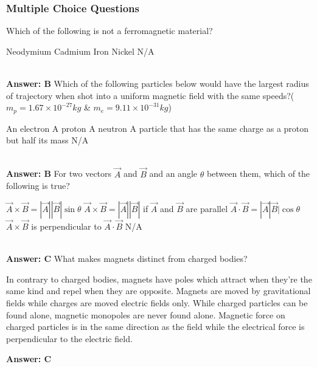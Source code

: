 \documentclass[12pt,addpoints]{exam}
\begin{document}
{{{				\subsubsection*{Multiple Choice Questions}
				\begin{questions}
					\question Which of the following is not a ferromagnetic material?\\ \begin{oneparchoices}
						\choice Neodymium
						\choice Cadmium
						\choice Iron
						\choice Nickel
						\choice N/A
					\end{oneparchoices} \\ \textbf{Answer: B}
					\question Which of the following particles below would have the largest radius of trajectory when shot into a uniform magnetic field with the same speeds?($m_p=1.67\times10^{-27}kg$ \& $m_e=9.11\times10^{-31}kg$) \\ \begin{oneparchoices}
						\choice An electron
						\choice A proton
						\choice A neutron
						\choice A particle that has the same charge as a proton but half its mass
						\choice N/A
					\end{oneparchoices} \\ \textbf{Answer: B}
					\question For two vectors $\vec{A}$ and $\vec{B}$ and an angle $\theta$ between them, which of the following is true?\\ \begin{oneparchoices}
						\choice $\vec{A}\times\vec{B}=|\vec{A}||\vec{B}|\sin\theta$
						\choice $\vec{A}\times\vec{B}=|\vec{A}||\vec{B}|$ if $\vec{A}$ and $\vec{B}$ are parallel
						\choice $\vec{A}\cdot\vec{B}=|\vec{A}|\vec{B}|\cos\theta$
						\choice $\vec{A}\times\vec{B}$ is perpendicular to $\vec{A}\cdot\vec{B}$
						\choice N/A
					\end{oneparchoices} \\ \textbf{Answer: C}
					\question What makes magnets distinct from charged bodies?
					\begin{choices}
						\choice In contrary to charged bodies, magnets have poles which attract when they're the same kind and repel when they are opposite.
						\choice Magnets are moved by gravitational fields while charges are moved electric fields only.
						\choice While charged particles can be found alone, magnetic monopoles are never found alone.
						\choice Magnetic force on charged particles is in the same direction as the field while the electrical force is perpendicular to the electric field.
					\end{choices}\textbf{Answer: C}

\end{questions}}}}
\end{document}
